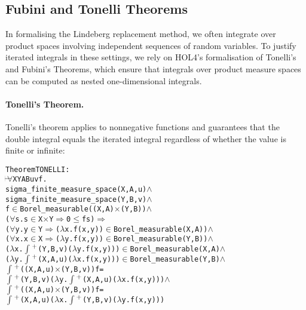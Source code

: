 \subsection{Fubini and Tonelli Theorems}

In formalising the Lindeberg replacement method, we often integrate over product spaces involving independent sequences of random variables. To justify iterated integrals in these settings, we rely on HOL4’s formalisation of Tonelli’s and Fubini’s Theorems, which ensure that integrals over product measure spaces can be computed as nested one-dimensional integrals.

\paragraph{Tonelli's Theorem.}
Tonelli's theorem applies to nonnegative functions and guarantees that the double integral equals the iterated integral regardless of whether the value is finite or infinite:

\begin{hol}
\begin{alltt}
Theorem TONELLI :
\(\!\!\!{\turn}\!\!\!\!\) \(\forall\)X Y A B u v f.
sigma\_finite\_measure\_space (X,A,u) \(\land\)
sigma\_finite\_measure\_space (Y,B,v) \(\land\)
f \(\in\) Borel\_measurable ((X,A) \(\times\) (Y,B)) \(\land\)
(\(\forall\)s. s \(\in\) X \(\times\) Y \(\Rightarrow\) 0 \(\le\) f s) \(\Rightarrow\)
(\(\forall\)y. y \(\in\) Y \(\Rightarrow\) (\(\lambda\)x. f (x,y)) \(\in\) Borel\_measurable (X,A)) \(\land\)
(\(\forall\)x. x \(\in\) X \(\Rightarrow\) (\(\lambda\)y. f (x,y)) \(\in\) Borel\_measurable (Y,B)) \(\land\)
(\(\lambda\)x. \(\int\)\(\sp{+}\) (Y,B,v) (\(\lambda\)y. f (x,y))) \(\in\) Borel\_measurable (X,A) \(\land\)
(\(\lambda\)y. \(\int\)\(\sp{+}\) (X,A,u) (\(\lambda\)x. f (x,y))) \(\in\) Borel\_measurable (Y,B) \(\land\)
\(\int\)\(\sp{+}\) ((X,A,u) \(\times\) (Y,B,v)) f =
\(\int\)\(\sp{+}\) (Y,B,v) (\(\lambda\)y. \(\int\)\(\sp{+}\) (X,A,u) (\(\lambda\)x. f (x,y))) \(\land\)
\(\int\)\(\sp{+}\) ((X,A,u) \(\times\) (Y,B,v)) f =
\(\int\)\(\sp{+}\) (X,A,u) (\(\lambda\)x. \(\int\)\(\sp{+}\) (Y,B,v) (\(\lambda\)y. f (x,y)))
\end{alltt}
\end{hol}

